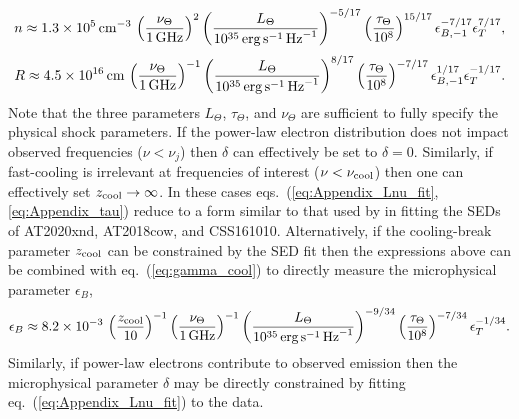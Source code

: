 \documentclass[twocolumn]{aastex63}
\begin{document}
\begin{equation}
    n \approx 1.3 \times 10^5 \,{\rm cm}^{-3}\,
    \left(\frac{\nu_\Theta}{1\,{\rm GHz}}\right)^{2} \left(\frac{L_\Theta}{10^{35}\,{\rm erg\,s}^{-1}\,{\rm Hz}^{-1}}\right)^{-5/17} \left(\frac{\tau_\Theta}{10^8}\right)^{15/17} \epsilon_{B,-1}^{-7/17} \epsilon_T^{7/17}
    ,
\end{equation}
\begin{equation}
    R \approx 4.5 \times 10^{16} \,{\rm cm}\,
    \left(\frac{\nu_\Theta}{1\,{\rm GHz}}\right)^{-1} \left(\frac{L_\Theta}{10^{35}\,{\rm erg\,s}^{-1}\,{\rm Hz}^{-1}}\right)^{8/17} \left(\frac{\tau_\Theta}{10^8}\right)^{-7/17} \epsilon_{B,-1}^{1/17} \epsilon_T^{-1/17}
    .
\end{equation}
Note that the three parameters $L_\Theta$, $\tau_\Theta$, and $\nu_\Theta$ are sufficient to fully specify the physical shock parameters. If the power-law electron distribution does not impact observed frequencies ($\nu < \nu_j$) then $\delta$ can effectively be set to $\delta = 0$. Similarly, if fast-cooling is irrelevant at frequencies of interest ($\nu < \nu_{\rm cool}$) then one can effectively set $z_{\rm cool} \to \infty$. In these cases eqs.~(\ref{eq:Appendix_Lnu_fit},\ref{eq:Appendix_tau}) reduce to a form similar to that used by \cite{Ho+21b} in fitting the SEDs of AT2020xnd, AT2018cow, and CSS161010.
Alternatively, if the cooling-break parameter $z_{\rm cool}$ can be constrained by the SED fit then the expressions above can be combined with eq.~(\ref{eq:gamma_cool}) to directly measure the microphysical parameter $\epsilon_B$,
\begin{equation}
    \epsilon_B \approx 8.2 \times 10^{-3} \,
    \left(\frac{z_{\rm cool}}{10}\right)^{-1} \left(\frac{\nu_\Theta}{1\,{\rm GHz}}\right)^{-1} \left(\frac{L_\Theta}{10^{35}\,{\rm erg\,s}^{-1}\,{\rm Hz}^{-1}}\right)^{-9/34} \left(\frac{\tau_\Theta}{10^8}\right)^{-7/34} \epsilon_T^{-1/34}
    .
\end{equation}
Similarly, if power-law electrons contribute to observed emission then the microphysical parameter $\delta$ may be directly constrained by fitting eq.~(\ref{eq:Appendix_Lnu_fit}) to the data.


{}



\end{document}
